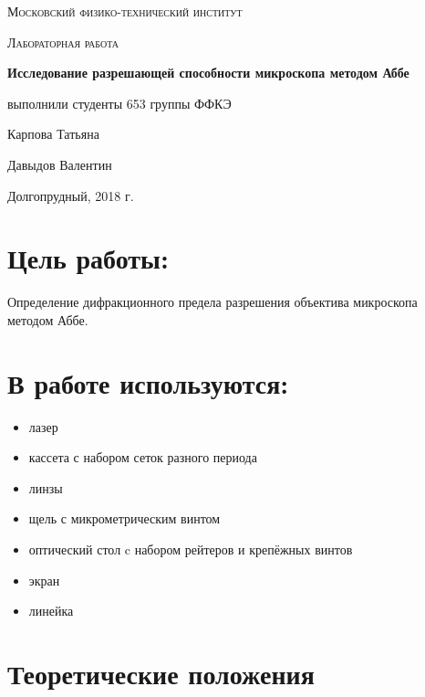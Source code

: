 \documentclass[a4paper]{article}
\begin{document}
\begin{titlepage}
	\centering
	\vspace{5cm}
	{\scshape\LARGE Московский физико-технический институт \par}
	\vspace{4cm}
	{\scshape\Large Лабораторная работа \par}
	\vspace{1cm}
	{\huge\bfseries Исследование разрешающей способности микроскопа методом Аббе \par}
	\vspace{1cm}
	\vfill
\begin{flushright}
	{\large выполнили студенты 653 группы ФФКЭ}\par
	\vspace{0.3cm}
	{\LARGE Карпова Татьяна} \par
		\vspace{0.3cm}
	{\LARGE Давыдов Валентин}
\end{flushright}
	

	\vfill

	Долгопрудный, 2018 г.
\end{titlepage}

\section{Цель работы:}
Определение дифракционного предела разрешения
объектива микроскопа методом Аббе.

\section{В работе используются:}
\begin{itemize}
    \item лазер
    \item кассета с набором сеток разного
периода
    \item линзы
    \item щель с микрометрическим винтом
    \item оптический стол
c набором рейтеров и крепёжных винтов
    \item экран
    \item линейка
\end{itemize}

\section{Теоретические положения}
\end{document}
